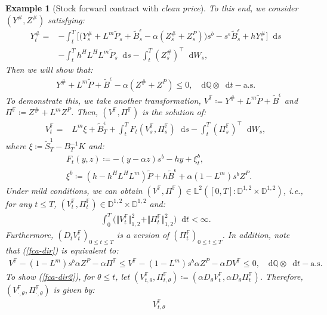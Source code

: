 \documentclass[a4paper, 11pt]{article}              %
\numberwithin{equation}{section}
\theoremstyle{plain}
\newcommand{\dqdt}{\df \dsQ \otimes \df t-\text{a.s}}
\newcommand{\1}{\mathds{1}}
\newcommand{\Bt}{\tilde{B}}
\newcommand{\St}{\tilde{S}}
\newcommand{\pt}{\tilde{P}}
\newcommand{\dsF}{\mathbb{F}}
\newcommand{\dsQ}{\mathbb{Q}}
\newcommand{\dsL}{\mathbb{L}}
\newcommand{\dsD}{\mathbb{D}}
\theoremstyle{plain}
\theoremstyle{definition}
\newtheorem{example}[thm]{Example}
\theoremstyle{plain}
\newtheorem{example}{Example}
\newcommand*\df{\mathop{}\!\mathrm{d}}
\begin{document}
\begin{example}[Stock forward contract with \textit{clean price}]
To this end, we consider $(Y^\#, Z^\#)$ satisfying:
\begin{align}
  Y^\#_t =& -\int_{t}^{T} \bigg[\big(Y^\#_s +L^m\pt_s +\Bt^\epsilon_s
            -\alpha(Z^\#_s+Z^P_s)\big)s^b-s^\epsilon\Bt^\epsilon_s+hY^\#_s\bigg]\df s\nonumber\\
          &-\int_{t}^{T} h^HL^HL^m \pt_s\df s
            -\int_{t}^{T}(Z^\#_s)^\top\df W_s, \nonumber 
\end{align}
Then we will show that:
\begin{align}
 Y^\# +L^m\pt +\Bt^\epsilon- \alpha(Z^\#+Z^P) \leq 0,~~\dqdt. \label{fca-dir}
\end{align}
To demonstrate this, we take another transformation,
$V^\dsF \coloneqq Y^\# + L^m\pt+\Bt^\epsilon$ and $\Pi^\dsF \coloneqq Z^\# +
L^mZ^P$. Then, $(V^\dsF, \Pi^\dsF)$ is the solution of:
\begin{align}
  V^\dsF_t =& L^m\xi + \Bt^\epsilon_T + \int_{t}^{T}F_t(V^\dsF_s, \Pi^\dsF_s)\df s  
      -\int_{t}^{T}(\Pi^\dsF_s)^\top\df W_s,\label{bsdess}
\end{align}
where $\xi \coloneqq \St^1_T -B^{-1}_TK$ and:
\begin{align}
    &F_t(y, z)\coloneqq-(y -\alpha z)s^{b}-hy+\xi^b_t,\label{ex.idea.F}\\
  &\xi^b \coloneqq
    (h-h^HL^HL^m )\pt + h\Bt^\epsilon + \alpha(1-L^m)s^bZ^P.\label{ex.idea.xib}\nonumber 
\end{align}
Under mild conditions, we can obtain
$(V^\dsF, \Pi^\dsF)\in \dsL^2([0, T]\colon \dsD^{1, 2} \times \dsD^{1, 2})$, i.e., for
any $t\leq T $, $(V^\dsF_t, \Pi^\dsF_t) \in \dsD^{1, 2} \times \dsD^{1, 2}$ and:
\begin{align}
  \int_{0}^{T} \big(\Vert V^\dsF_t \Vert^2_{1, 2} + \Vert \Pi^\dsF_t \Vert^2_{1, 2}\big)\df t < \infty. 
\end{align}
Furthermore, $(D_tV^\dsF_t)_{0\leq t \leq T}$ is a version of
$(\Pi^\dsF_t)_{0\leq t \leq T}$. In addition, note that (\ref{fca-dir}) is equivalent to:
\begin{align}
  V^\dsF  -(1-L^m)s^b\alpha Z^P- \alpha \Pi^\dsF \leq V^\dsF -(1-L^m)s^b\alpha Z^P - \alpha DV^\dsF\leq0, ~~\dqdt. \label{fca-dir2}
\end{align}
To show (\ref{fca-dir2}), 
 for $\theta \leq t$, let $(V^\dsF_{t, \theta}, \Pi^\dsF_{t, \theta})\coloneqq(\alpha D_\theta V^\dsF_t,
 \alpha D_\theta \Pi^\dsF_t)$. Therefore, $(V^\dsF_{\cdot, \theta}, \Pi^\dsF_{\cdot, \theta})$ is given by:
\begin{align}
  &V^\dsF_{t, \theta}

\end{align}
\end{example}
\end{document}
